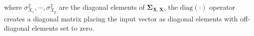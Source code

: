 \noindent where $\sigma_{X_{1}}^{2}, \cdots, \sigma_{X_{p}}^{2}$
are the diagonal elements of $\boldsymbol{\Sigma}_{\mathbf{X}, \mathbf{X}}$,
the $\mathrm{diag} \left( \cdot \right)$
operator creates a diagonal matrix
placing the input vector
as diagonal elements
with off-diagonal elements set to zero.